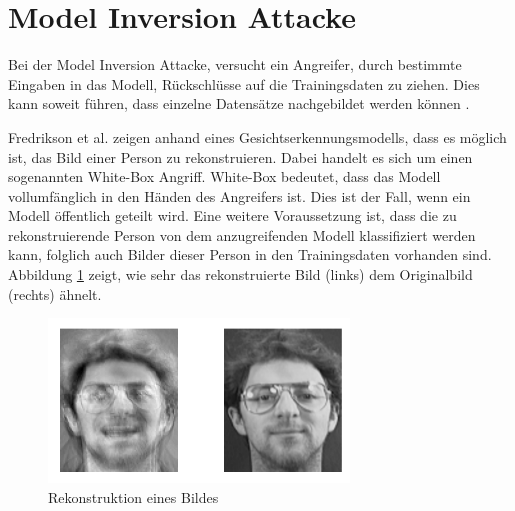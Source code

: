 \section{Model Inversion Attacke}\label{sec:model_inversion}

Bei der Model Inversion Attacke, versucht ein Angreifer, durch bestimmte Eingaben in das Modell, Rückschlüsse auf die Trainingsdaten zu ziehen. Dies kann soweit führen, dass einzelne Datensätze nachgebildet werden können \cite{P-3}. 

Fredrikson et al. \cite{P-3} zeigen anhand eines Gesichtserkennungsmodells, dass es möglich ist, das Bild einer Person zu rekonstruieren.
Dabei handelt es sich um einen sogenannten White-Box Angriff.
White-Box bedeutet, dass das Modell vollumfänglich in den Händen des Angreifers ist.
Dies ist der Fall, wenn ein Modell öffentlich geteilt wird.
Eine weitere Voraussetzung ist, dass die zu rekonstruierende Person von dem anzugreifenden Modell klassifiziert werden kann, folglich auch Bilder dieser Person in den Trainingsdaten vorhanden sind.
Abbildung \ref{fig:mi_attacke} zeigt, wie sehr das rekonstruierte Bild (links) dem Originalbild (rechts) ähnelt.

\begin{figure}[!htb]
    \centering
    \includegraphics[width=8cm]{figures/mi_attack}
    \caption{Rekonstruktion eines Bildes \cite{P-3}}
    \label{fig:mi_attacke}
\end{figure} 

